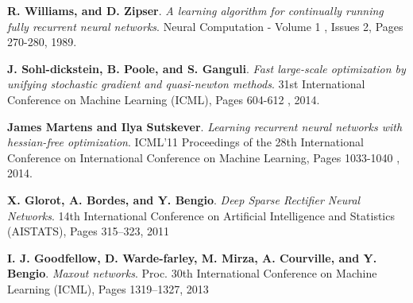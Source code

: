 \documentclass[12pt]{report}
\begin{document}
\begin{thebibliography}{9}
\textbf{R. Williams, and D. Zipser}.
\textit{A learning algorithm for continually running fully recurrent neural networks}.
Neural Computation - Volume 1 , Issues 2, Pages 270-280, 1989.


\textbf{J. Sohl-dickstein, B. Poole, and S. Ganguli}.
\textit{Fast large-scale optimization by unifying stochastic gradient and quasi-newton methods}.
31st International Conference on Machine Learning (ICML), Pages 604-612 , 2014. 

\textbf{James Martens and Ilya Sutskever}.
\textit{Learning recurrent neural networks with hessian-free optimization}.
ICML'11 Proceedings of the 28th International Conference on International Conference on Machine Learning, Pages 1033-1040 , 2014. 

\textbf{X. Glorot, A. Bordes, and Y. Bengio}.
\textit{Deep Sparse Rectifier Neural Networks}.
14th International Conference on Artificial Intelligence and Statistics (AISTATS), Pages 315–323, 2011

\textbf{I. J. Goodfellow, D. Warde-farley, M. Mirza, A. Courville, and Y. Bengio}.
\textit{Maxout networks}.
Proc. 30th International Conference on Machine Learning (ICML), Pages 1319–1327, 2013





\end{thebibliography}
\end{document}
